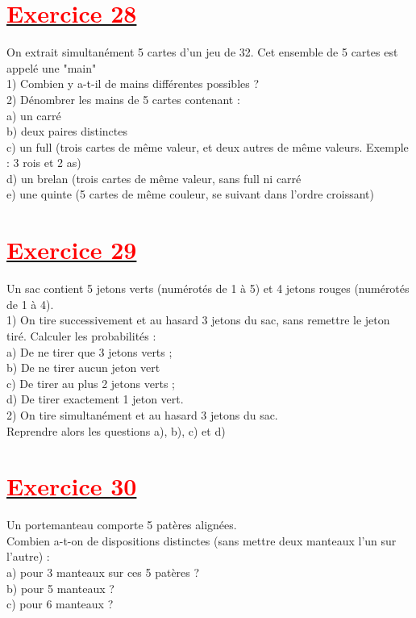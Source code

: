 \documentclass[12pt,a4paper]{article}
\begin{document}
\section*{\underline{\textbf{\textcolor{red}{Exercice 28}}}}
On extrait simultanément 5 cartes d'un jeu de 32. Cet ensemble de 5 cartes est appelé une "main"\\
1) Combien y a-t-il de mains différentes possibles ?\\
2) Dénombrer les mains de 5 cartes contenant :\\
a) un carré\\
b) deux paires distinctes\\
c) un full (trois cartes de même valeur, et deux autres de même valeurs. Exemple : 3 rois et 2 as)\\
d) un brelan (trois cartes de même valeur, sans full ni carré\\
e) une quinte (5 cartes de même couleur, se suivant dans l'ordre croissant)\\
\section*{\underline{\textbf{\textcolor{red}{Exercice 29}}}}
Un sac contient 5 jetons verts (numérotés de 1 à 5) et 4 jetons rouges (numérotés de 1 à 4).\\
1) On tire successivement et au hasard 3 jetons du sac, sans remettre le jeton tiré. Calculer les probabilités :\\
a) De ne tirer que 3 jetons verts ;\\
b) De ne tirer aucun jeton vert\\
c) De tirer au plus 2 jetons verts ;\\
d) De tirer exactement 1 jeton vert.\\
2) On tire simultanément et au hasard 3 jetons du sac.\\
Reprendre alors les questions a), b), c) et d)
\section*{\underline{\textbf{\textcolor{red}{Exercice 30}}}}
Un portemanteau comporte 5 patères alignées.\\ 
Combien a-t-on de dispositions distinctes (sans mettre deux manteaux l’un sur l’autre) :\\
a) pour 3 manteaux sur ces 5 patères ?\\
b) pour 5 manteaux ?\\
c) pour 6 manteaux ?\\
\end{document}

